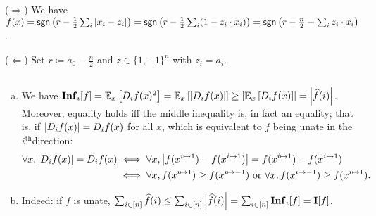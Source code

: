 \documentclass[12pt]{article}
\newcommand{\fbitset}{\{1,-1\}}
\newcommand{\E}[2]{\mathbb E_{#1}\left[#2\right]}
\newcommand{\Inf}{\mathbf{Inf}}
\newcommand{\I}{\mathbf{I}}
\newcommand{\ith}{$i^\text{th}$}
\newcommand{\hf}{\widehat{f}}
\newcommand{\sumi}{\sum_{i \in [n]}}
\begin{document}
\subsection{}
($\Longrightarrow$) We have $f(x) = \textsf{sgn}\left(r - \frac1{2}\sum_i \abs{x_i - z_i}\right) = \textsf{sgn}\left(r - \frac1{2}\sum_i (1 - z_i \cdot x_i)\right) = \textsf{sgn}\left(r - \frac{n}{2} + \sum_i z_i \cdot x_i\right)$.

\noindent ($\Longleftarrow$) Set $r \coloneqq a_0 - \frac{n}{2}$ and $z \in \fbitset^n$ with $z_i = a_i$.

\subsection{}
\begin{enumerate}[(a)]
    \item We have $\Inf_i[f] = \E{x}{D_i f(x)^2} = \E{x}{\abs{D_i f(x)}} \geq \abs{\E{x}{D_i f(x)}} = \abs{\hf(i)}$. Moreover, equality holds iff the middle inequality is, in fact an equality; that is, if $\abs{D_i f(x)} = D_i f(x)$ for all $x$, which is equivalent to $f$ being unate in the \ith direction:
    \begin{align*}
        \forall x, \abs{D_i f(x)} = D_i f(x) &\iff \forall x, \abs{f(x^{i \mapsto 1}) - f(x^{i \mapsto 1})} = f(x^{i \mapsto 1}) - f(x^{i \mapsto 1})\\
        &\iff \forall x, f(x^{i \mapsto 1}) \geq f(x^{i \mapsto -1}) \text{ or } \forall x, f(x^{i \mapsto -1}) \geq f(x^{i \mapsto 1}).
    \end{align*}
    
    \item Indeed: if $f$ is unate, $\sumi \hf(i) \leq \sumi \abs{\hf(i)} = \sumi \Inf_i [f] = \I[f]$.
\end{enumerate}

\subsection{}

\subsection{}

\subsection{}

\subsection{}
\end{document}
